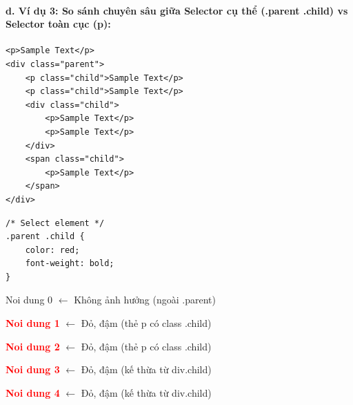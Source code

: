 \paragraph{d. Ví dụ 3: So sánh chuyên sâu giữa Selector cụ thể (.parent .child) vs Selector toàn cục (p):}

\begin{codeWindow}
\begin{lstlisting}[language=HTML5]
<p>Sample Text</p>
<div class="parent">
    <p class="child">Sample Text</p>
    <p class="child">Sample Text</p>
    <div class="child">
        <p>Sample Text</p>
        <p>Sample Text</p>
    </div>
    <span class="child">
        <p>Sample Text</p>
    </span>
</div>
\end{lstlisting}
\end{codeWindow}

\begin{codeWindow}
\begin{lstlisting}[language=CSS3]
/* Select element */
.parent .child {
    color: red;
    font-weight: bold;
}
\end{lstlisting}
\end{codeWindow}

\begin{browserWindow}
\sffamily\small
\textcolor{darkText}{Noi dung 0} {\small\textcolor{gray!60}{$\leftarrow$ Không ảnh hưởng (ngoài .parent)}} \par\vspace{4pt}
\begin{tcolorbox}[arc=2pt, colback=primaryBlue!5, colframe=primaryBlue!40, boxrule=1pt, title={\sffamily\small\color{white}\textbf{.parent}}, colbacktitle=primaryBlue!70]
\textcolor{red}{\textbf{Noi dung 1}} {\small\textcolor{gray!60}{$\leftarrow$ Đỏ, đậm (thẻ p có class .child)}} \par\vspace{2pt}
\textcolor{red}{\textbf{Noi dung 2}} {\small\textcolor{gray!60}{$\leftarrow$ Đỏ, đậm (thẻ p có class .child)}} \par\vspace{3pt}
\begin{tcolorbox}[arc=2pt, colback=red!5, colframe=red!40, boxrule=1pt, title={\sffamily\scriptsize\color{white}\textbf{div.child (Đổi màu toàn bộ nội dung trong div)}}, colbacktitle=red!70]
\textcolor{red}{\textbf{Noi dung 3}} {\small\textcolor{gray!60}{$\leftarrow$ Đỏ, đậm (kế thừa từ div.child)}} \par\vspace{2pt}
\textcolor{red}{\textbf{Noi dung 4}} {\small\textcolor{gray!60}{$\leftarrow$ Đỏ, đậm (kế thừa từ div.child)}}
\end{tcolorbox}\vspace{3pt}
\end{tcolorbox}
\end{browserWindow}

